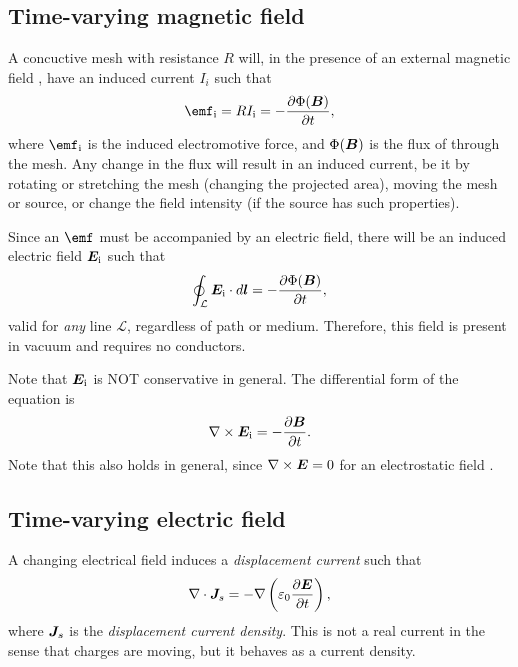 \subsection{Time-varying magnetic field}
    A concuctive mesh with resistance $R$ will, in the presence of an external magnetic field \B, 
    have an induced current $I_i$ such that
    \begin{equation}
        \emf_\text{i} = RI_\text{i} = -\frac{\partial \Phi(\B)}{\partial t},
    \end{equation}
    where $\emf_\text{i}$ is the induced electromotive force, and $\Phi(\bm{B})$ is the flux of \B{} through the mesh. 
    Any change in the flux will result in an induced current, 
    be it by rotating or stretching the mesh (changing the projected area),
    moving the mesh or source, or change the field intensity (if the source has such properties).

    Since an $\emf$ must be accompanied by an electric field, 
    there will be an induced electric field $\bm{E}_\text{i}$ such that
    \begin{equation}
        \oint_\mathcal{L}\bm{E}_\text{i}\cdot d\bm{l} = -\frac{\partial \Phi(\bm{B})}{\partial t},
    \end{equation}
    valid for \textit{any} line $\mathcal{L}$, regardless of path or medium. 
    Therefore, this field is present in vacuum and requires no conductors.

    Note that $\bm{E}_\text{i}$ is NOT conservative in general. The differential form of the equation is
    \begin{equation}
        \nabla \times \bm{E}_\text{i} = -\frac{\partial \bm{B}}{\partial t}.
    \end{equation}
    Note that this also holds in general, since $\nabla\times\bm{E} = 0$ for an electrostatic field \E.

\subsection{Time-varying electric field} \label{Time-varying electric field}
    A changing electrical field induces a \textit{displacement current} such that
    \begin{equation}
        \nabla \cdot \bm{J}_s = -\nabla\left(\varepsilon_0\frac{\partial\bm{E}}{\partial t}\right),
    \end{equation}
    where $\bm{J}_s$ is the \textit{displacement current density}. This is not a real current in the sense that charges are moving, 
    but it behaves as a current density.

